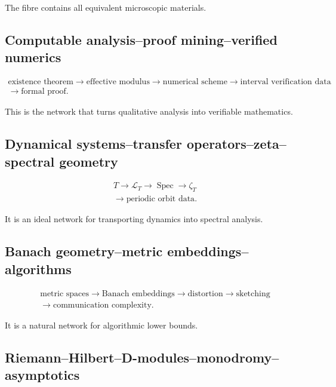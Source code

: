 \documentclass[11pt]{article}
\begin{document}
The fibre contains all equivalent microscopic materials.



\subsection{Computable analysis--proof mining--verified numerics}

\[
\begin{gathered}
\text{existence theorem} \to \text{effective modulus} \to \text{numerical scheme} \to \text{interval verification data} \\
\to \text{formal proof}.
\end{gathered}
\]

This is the network that turns qualitative analysis into verifiable mathematics.



\subsection{Dynamical systems--transfer operators--zeta--spectral geometry}

\[
\begin{gathered}
T \to \mathcal L_T \to \operatorname{Spec} \to \zeta_T \\
\to \text{periodic orbit data}.
\end{gathered}
\]

It is an ideal network for transporting dynamics into spectral analysis.



\subsection{Banach geometry--metric embeddings--algorithms}

\[
\begin{gathered}
\text{metric spaces} \to \text{Banach embeddings} \to \text{distortion} \to \text{sketching} \\
\to \text{communication complexity}.
\end{gathered}
\]

It is a natural network for algorithmic lower bounds.



\subsection{Riemann--Hilbert--D-modules--monodromy--asymptotics}
\end{document}
